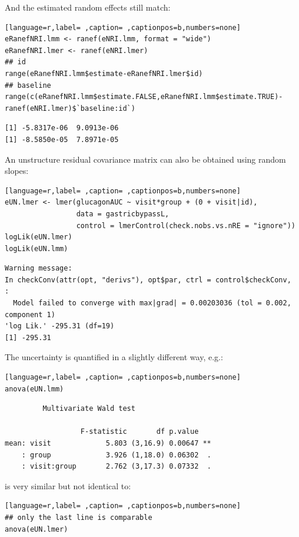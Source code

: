 \documentclass[12pt]{article}
\begin{document}
And the estimated random effects still match:
\begin{lstlisting}[language=r,label= ,caption= ,captionpos=b,numbers=none]
eRanefNRI.lmm <- ranef(eNRI.lmm, format = "wide")
eRanefNRI.lmer <- ranef(eNRI.lmer)
## id
range(eRanefNRI.lmm$estimate-eRanefNRI.lmer$id)
## baseline
range(c(eRanefNRI.lmm$estimate.FALSE,eRanefNRI.lmm$estimate.TRUE)-ranef(eNRI.lmer)$`baseline:id`)
\end{lstlisting}

\begin{verbatim}
[1] -5.8317e-06  9.0913e-06
[1] -8.5850e-05  7.8971e-05
\end{verbatim}


\clearpage

An unstructure residual covariance matrix can also be obtained using
random slopes:
\begin{lstlisting}[language=r,label= ,caption= ,captionpos=b,numbers=none]
eUN.lmer <- lmer(glucagonAUC ~ visit*group + (0 + visit|id),
                 data = gastricbypassL,
                 control = lmerControl(check.nobs.vs.nRE = "ignore"))
logLik(eUN.lmer)
logLik(eUN.lmm)
\end{lstlisting}

\begin{verbatim}
Warning message:
In checkConv(attr(opt, "derivs"), opt$par, ctrl = control$checkConv,  :
  Model failed to converge with max|grad| = 0.00203036 (tol = 0.002, component 1)
'log Lik.' -295.31 (df=19)
[1] -295.31
\end{verbatim}


The uncertainty is quantified in a slightly different way, e.g.:
\begin{lstlisting}[language=r,label= ,caption= ,captionpos=b,numbers=none]
anova(eUN.lmm)
\end{lstlisting}

\begin{verbatim}
	     Multivariate Wald test 

                  F-statistic       df p.value   
mean: visit             5.803 (3,16.9) 0.00647 **
    : group             3.926 (1,18.0) 0.06302  .
    : visit:group       2.762 (3,17.3) 0.07332  .
\end{verbatim}


is very similar but not identical to:
\begin{lstlisting}[language=r,label= ,caption= ,captionpos=b,numbers=none]
## only the last line is comparable
anova(eUN.lmer)
\end{lstlisting}
\end{document}

